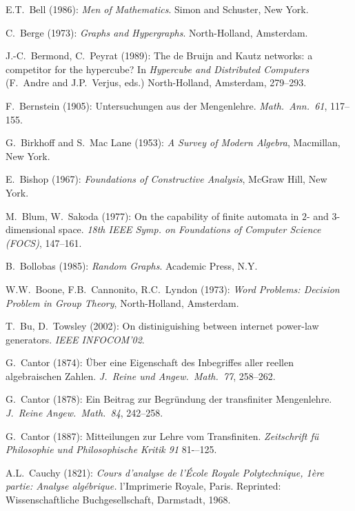 \begin{thebibliography}{999}
E.T.~Bell (1986):
{\it Men of Mathematics}.
Simon and Schuster, New York.

C.~Berge (1973):
{\it Graphs and Hypergraphs}.
North-Holland, Amsterdam.

J.-C.~Bermond, C.~Peyrat (1989):
The de Bruijn and Kautz networks: a competitor for the hypercube?
In {\it Hypercube and Distributed Computers} (F.~Andre and
J.P.~Verjus, eds.)  North-Holland, Amsterdam, 279--293.

F.~Bernstein (1905): Untersuchungen aus der Mengenlehre. {\it
Math.~Ann.~61}, 117--155.

G.~Birkhoff and S.~Mac Lane (1953): {\it A Survey of Modern Algebra},
Macmillan, New York.

E.~Bishop (1967): {\it Foundations of Constructive Analysis},
McGraw Hill, New York.

M.~Blum, W.~Sakoda (1977):
On the capability of finite automata in $2$- and $3$- dimensional
space.  {\it 18th IEEE Symp. on Foundations of Computer Science
  (FOCS)}, 147--161.

B.~Bollobas (1985):
{\it Random Graphs}.
Academic Press, N.Y.

W.W.~Boone, F.B.~Cannonito, R.C.~Lyndon (1973):
{\it Word Problems: Decision Problem in Group Theory}, North-Holland,
Amsterdam.

T.~Bu, D.~Towsley (2002):
On distiniguishing between internet power-law generators.
{\it IEEE INFOCOM'02}.


G.~Cantor (1874): \"{U}ber eine Eigenschaft des Inbegriffes aller
reellen algebraischen Zahlen.  {\it J.~Reine und Angew.~Math.~77},
258--262.

G.~Cantor (1878): Ein Beitrag zur Begr\"{u}ndung der transfiniter
Mengenlehre.  {\it J.~Reine Angew.~Math.~84}, 242--258.

G.~Cantor (1887): Mitteilungen zur Lehre vom Transfiniten.
{\it Zeitschrift f\"{u} Philosophie und Philosophische Kritik 91}
81-–125.

A.L.~Cauchy (1821): {\it Cours d'analyse de l'\'{E}cole Royale
Polytechnique, 1\`{e}re partie: Analyse alg\'{e}brique.}
l'Imprimerie Royale, Paris.  Reprinted: Wissenschaftliche
Buchgesellschaft, Darmstadt, 1968.


\end{thebibliography}
